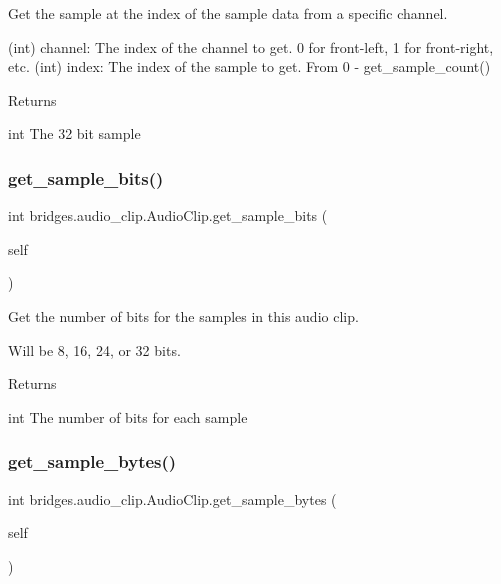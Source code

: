 Get the sample at the index of the sample data from a specific channel. 

\begin{DoxyVerb}       (int) channel: The index of the channel to get. 0 for front-left, 1 for front-right, etc.
       (int) index: The index of the sample to get. From 0 - get_sample_count()
\end{DoxyVerb}
 \begin{DoxyReturn}{Returns}


int The 32 bit sample 
\end{DoxyReturn}
\mbox{\label{classbridges_1_1audio__clip_1_1_audio_clip_a42961560a55008ba85d956f124728984}} 
\subsubsection{\texorpdfstring{get\_sample\_bits()}{get\_sample\_bits()}}
{\footnotesize\ttfamily  int bridges.\+audio\+\_\+clip.\+Audio\+Clip.\+get\+\_\+sample\+\_\+bits (\begin{DoxyParamCaption}\item[{}]{self }\end{DoxyParamCaption})}



Get the number of bits for the samples in this audio clip. 

Will be 8, 16, 24, or 32 bits. \begin{DoxyReturn}{Returns}


int The number of bits for each sample 
\end{DoxyReturn}
\mbox{\label{classbridges_1_1audio__clip_1_1_audio_clip_ab63866904ac833bdcf8b669b90008a64}} 
\subsubsection{\texorpdfstring{get\_sample\_bytes()}{get\_sample\_bytes()}}
{\footnotesize\ttfamily  int bridges.\+audio\+\_\+clip.\+Audio\+Clip.\+get\+\_\+sample\+\_\+bytes (\begin{DoxyParamCaption}\item[{}]{self }\end{DoxyParamCaption})}



